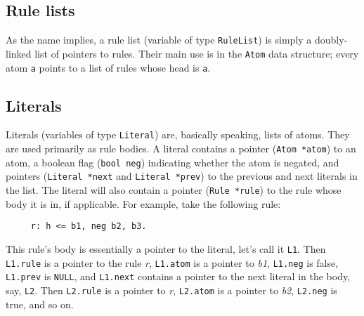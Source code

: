 \documentclass[a4paper,10pt,twocolumn]{article}
\begin{document}
\subsection{Rule lists}

As the name implies, a rule list (variable of type \texttt{RuleList})
is simply a doubly-linked list of pointers to rules. Their main use is
in the \texttt{Atom} data structure; every atom \texttt{a} points to a
list of rules whose head is \texttt{a}.

\subsection{Literals}

Literals (variables of type \texttt{Literal}) are, basically speaking,
lists of atoms. They are used primarily as rule bodies. A literal
contains a pointer (\texttt{Atom *atom}) to an atom, a boolean flag
(\texttt{bool neg}) indicating whether the atom is negated, and
pointers (\texttt{Literal *next} and \texttt{Literal *prev}) to the
previous and next literals in the list. The literal will also contain
a pointer (\texttt{Rule *rule}) to the rule whose body it is in, if
applicable.  For example, take the following rule:
\begin{verbatim}
     r: h <= b1, neg b2, b3.
\end{verbatim}
This rule's body is essentially a pointer to the literal, let's call
it \texttt{L1}. Then \texttt{L1.rule} is a pointer to the rule
\textit{r}, \texttt{L1.atom} is a pointer to \textit{b1},
\texttt{L1.neg} is false, \texttt{L1.prev} is \texttt{NULL}, and
\texttt{L1.next} contains a pointer to the next literal in the body,
say, \texttt{L2}. Then \texttt{L2.rule} is a pointer to \textit{r},
\texttt{L2.atom} is a pointer to \textit{b2}, \texttt{L2.neg} is true,
and so on.
\end{document}

